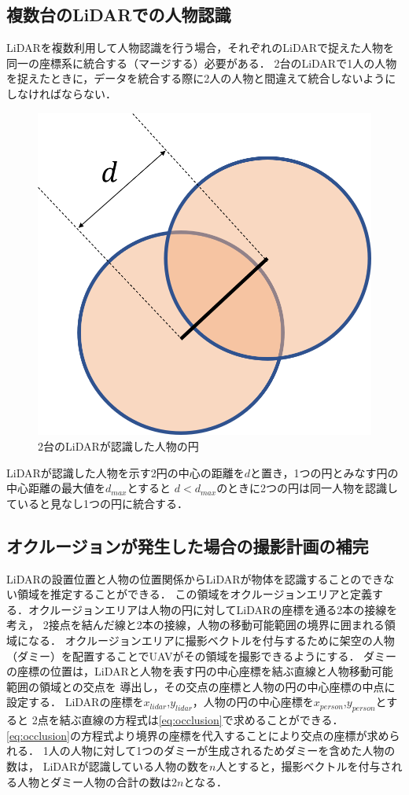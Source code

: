 \documentclass[autodetect-engine,dvipdfmx-if-dvi,ja=standard,a4j,jbase=10.5pt,twoside,twocolumn,magstyle=nomag*]{bxjsarticle}
\begin{document}
\subsection{複数台のLiDARでの人物認識} 
LiDARを複数利用して人物認識を行う場合，それぞれのLiDARで捉えた人物を同一の座標系に統合する（マージする）必要がある．
2台のLiDARで1人の人物を捉えたときに，データを統合する際に2人の人物と間違えて統合しないようにしなければならない．

\begin{figure}[h]
    \centering
    \includegraphics[width=0.7\linewidth, clip]{./figure/merge_circle.png}
    \caption{2台のLiDARが認識した人物の円}
    \label{fig:circle}
\end{figure}

LiDARが認識した人物を示す2円の中心の距離を$d$と置き，1つの円とみなす円の中心距離の最大値を$d_{max}$とすると
$d < d_{max}$のときに2つの円は同一人物を認識していると見なし1つの円に統合する．


\subsection{オクルージョンが発生した場合の撮影計画の補完}
LiDARの設置位置と人物の位置関係からLiDARが物体を認識することのできない領域を推定することができる．
この領域をオクルージョンエリアと定義する．オクルージョンエリアは人物の円に対してLiDARの座標を通る2本の接線を考え，
2接点を結んだ線と2本の接線，人物の移動可能範囲の境界に囲まれる領域になる．
オクルージョンエリアに撮影ベクトルを付与するために架空の人物（ダミー）を配置することでUAVがその領域を撮影できるようにする．
ダミーの座標の位置は，LiDARと人物を表す円の中心座標を結ぶ直線と人物移動可能範囲の領域との交点を
導出し，その交点の座標と人物の円の中心座標の中点に設定する．
LiDARの座標を$x_{lidar}$,$y_{lidar}$，人物の円の中心座標を$x_{person}$,$y_{person}$とすると
2点を結ぶ直線の方程式は\cref{eq:occlusion}で求めることができる．\cref{eq:occlusion}の方程式より境界の座標を代入することにより交点の座標が求められる．
1人の人物に対して1つのダミーが生成されるためダミーを含めた人物の数は，
LiDARが認識している人物の数を$n$人とすると，撮影ベクトルを付与される人物とダミー人物の合計の数は$2n$となる．
\end{document}

